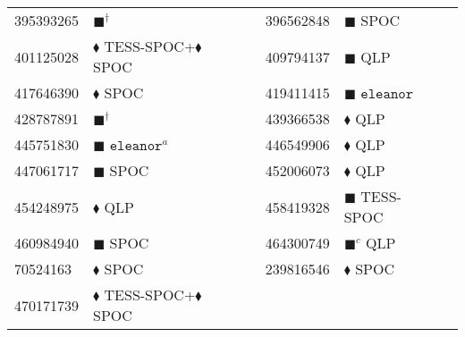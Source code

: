 \begin{longtable}{llrllr}
395393265 & $\blacksquare^\dagger$ & \cite{TIC_428787891} & 396562848 & $\blacksquare$ SPOC & \cite{TIC_396562848} \\
401125028 & $\blacklozenge$ TESS-SPOC+$\blacklozenge$ SPOC & \cite{TIC_446549906} & 409794137 & $\blacksquare$ QLP & \cite{TIC_409794137} \\
417646390 & $\blacklozenge$ SPOC & \cite{TIC_70524163} & 419411415 & $\blacksquare$ $\texttt{eleanor}$ & \cite{TIC_419411415} \\
428787891 & $\blacksquare^\dagger$ & \cite{TIC_428787891} & 439366538 & $\blacklozenge$ QLP & \cite{TIC_439366538} \\
445751830 & $\blacksquare$ $\texttt{eleanor}^a$ & \cite{TIC_445751830} & 446549906 & $\blacklozenge$ QLP & \cite{TIC_446549906} \\
447061717 & $\blacksquare$ SPOC & \cite{TIC_447061717} & 452006073 & $\blacklozenge$ QLP & \cite{TIC_439366538} \\
454248975 & $\blacklozenge$ QLP & \cite{TIC_156648452} & 458419328 & $\blacksquare$ TESS-SPOC & \cite{TIC_458419328} \\
460984940 & $\blacksquare$ SPOC & \cite{TIC_460984940} & 464300749 & $\blacksquare^c$ QLP & \cite{TIC_464300749} \\
70524163 & $\blacklozenge$ SPOC & \cite{TIC_70524163} & 239816546 & $\blacklozenge$ SPOC & \cite{TIC_70524163} \\
470171739 & $\blacklozenge$ TESS-SPOC+$\blacklozenge$ SPOC & \cite{TIC_446549906} \\


\end{longtable}
